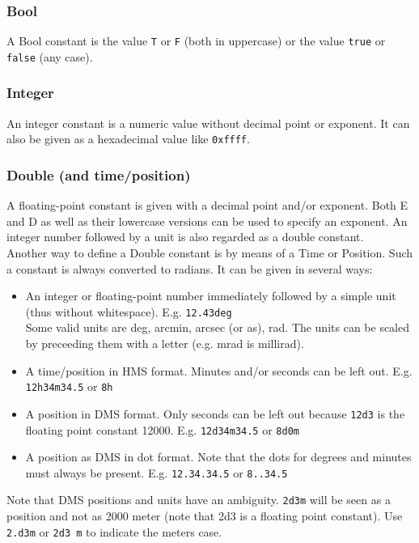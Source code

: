 \subsubsection{Bool}
  A Bool constant is the value \texttt{T} or \texttt{F} (both in
  uppercase) or the value \texttt{true} or \texttt{false} (any case).
\subsubsection{Integer}
  An integer constant is a numeric value without decimal point or exponent.
  It can also be given as a hexadecimal value like \texttt{0xffff}.
\subsubsection{Double (and time/position)}
  A floating-point constant is given with a decimal point and/or
  exponent. Both E and D as well as their lowercase versions can be
  used to specify an exponent. An integer
  number followed by a unit is also regarded as a double constant.
  \\Another way to define a Double constant is by means of
  a Time or Position. Such a constant is always converted to radians.
  It can be given in several ways:
  \begin{itemize}
  \item An integer or floating-point number immediately
    followed by a simple unit
    (thus without whitespace). E.g. \texttt{12.43deg}
    \\Some valid units are deg, arcmin, arcsec (or as), rad.
    The units can be scaled by preceeding them with a letter
    (e.g. mrad is millirad).
  \item A time/position in HMS format. Minutes and/or
    seconds can be left out.
    E.g. \texttt{12h34m34.5} or \texttt{8h}
  \item A position in DMS format. Only seconds can be
    left out because \texttt{12d3} is the floating point constant 12000.
    E.g. \texttt{12d34m34.5} or \texttt{8d0m}
  \item A position as DMS in dot format. Note that the dots
    for degrees and minutes must always be present.
    E.g. \texttt{12.34.34.5} or \texttt{8..34.5}
  \end{itemize}
  Note that DMS positions and units have an ambiguity.
  \texttt{2d3m} will be seen as a position and not
  as 2000 meter (note that 2d3 is a floating point constant).
  Use \texttt{2.d3m} or \texttt{2d3 m} to indicate the meters case.
